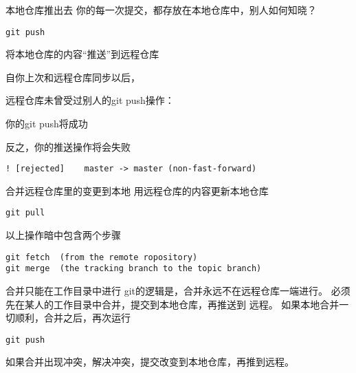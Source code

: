 \begin{frame}[<+->][fragile]{本地仓库推出去}
\onslide<+->
你的每一次提交，都存放在本地仓库中，别人如何知晓？
\onslide<+->
\begin{Verbatim}[frame=single,commandchars=\\\{\}]
git push
\end{Verbatim}
将本地仓库的内容“推送”到远程仓库

\onslide<+->
\medskip
自你上次和远程仓库同步以后，
\medskip

\onslide<+->
    远程仓库未曾受过别人的git push操作：
    
    你的git push将成功

\onslide<+->
\medskip
    反之，你的推送操作将会失败

    \begin{Verbatim}[frame=single,commandchars=\\\{\}]
! [rejected]    master -> master (non-fast-forward)
    \end{Verbatim}
\end{frame}

\begin{frame}[<+->][fragile]{合并远程仓库里的变更到本地}
\onslide<+->
用远程仓库的内容更新本地仓库
\begin{Verbatim}[frame=single,commandchars=\\\{\}]
git pull
\end{Verbatim}

\onslide<+->
以上操作暗中包含两个步骤
\begin{Verbatim}[frame=single,commandchars=\\\{\}]
git fetch  (from the remote ropository)
git merge  (the tracking branch to the topic branch)
\end{Verbatim}
\end{frame}

\begin{frame}[<+->][fragile]{合并只能在工作目录中进行}
\onslide<+->
git的逻辑是，合并永远不在远程仓库一端进行。
必须先在某人的工作目录中合并，提交到本地仓库，再推送到
远程。
\onslide<+->
如果本地合并一切顺利，合并之后，再次运行
\begin{Verbatim}[frame=single,commandchars=\\\{\}]
git push
\end{Verbatim}
\onslide<+->
如果合并出现冲突，解决冲突，提交改变到本地仓库，再推到远程。
\end{frame}


